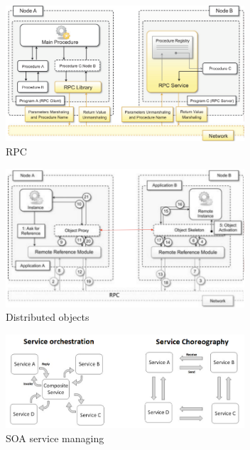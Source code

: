 \documentclass{article}
\begin{document}
\begin{figure}[H]
    \centering
    \includegraphics[width=3.5in]{imgs/rpc.PNG}
    \caption{RPC}
    \label{fig:rpc}
\end{figure}
\begin{figure}[H]
    \centering
    \includegraphics[width=3.5in]{imgs/distributedobjects.PNG}
    \caption{Distributed objects}
    \label{fig:rpc}
\end{figure}
\begin{figure}[H]
    \centering
    \includegraphics[width=3.5in]{imgs/orchestration vs choreography.PNG}
    \caption{SOA service managing}
    \label{fig:rpc}
\end{figure}
\end{document}
